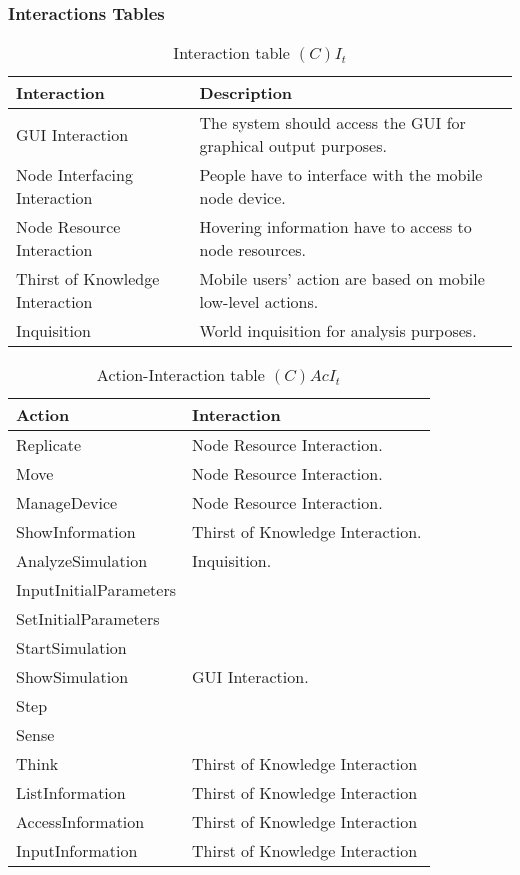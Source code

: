 \subsubsection{Interactions Tables}

\begin{table}[H]
	\centering
	\begin{tabular}{|p{4cm}|p{8cm}|}
			\hline
			\textbf{Interaction} & \textbf{Description} \\
			\hline
			GUI Interaction & The system should access the GUI for graphical output
			purposes. \\
			\hline
			Node Interfacing Interaction & People have to interface with the mobile node
			device. \\
			\hline
			Node Resource Interaction & Hovering information have to access to node
			resources. \\
			\hline
			Thirst of Knowledge Interaction & Mobile users' action are based on mobile
			low-level actions. \\
			\hline
			Inquisition & World inquisition for analysis purposes. \\
			\hline
		\end{tabular}
	\caption{Interaction table $(C)I_t$}
	\label{tab:cit}
\end{table}

\begin{table}[H]
	\centering
	\begin{tabular}{|p{4cm}|p{8cm}|}
			\hline
			\textbf{Action} & \textbf{Interaction} \\
			\hline
			Replicate & Node Resource Interaction. \\
			\hline
			Move & Node Resource Interaction. \\
			\hline
			ManageDevice & Node Resource Interaction. \\
			\hline
			ShowInformation & Thirst of Knowledge Interaction.\\
			\hline
			AnalyzeSimulation & Inquisition. \\
			\hline
			InputInitialParameters & \\
			\hline
			SetInitialParameters & \\
			\hline
			StartSimulation & \\
			\hline
			ShowSimulation & GUI Interaction. \\
			\hline
			Step & \\
			\hline
			Sense & \\
			\hline
			Think & Thirst of Knowledge Interaction \\
			\hline
			ListInformation & Thirst of Knowledge Interaction \\
			\hline
			AccessInformation & Thirst of Knowledge Interaction \\
			\hline
			InputInformation & Thirst of Knowledge Interaction \\
			\hline
		\end{tabular}
	\caption{Action-Interaction table $(C)AcI_t$}
	\label{tab:cacit}
\end{table}

